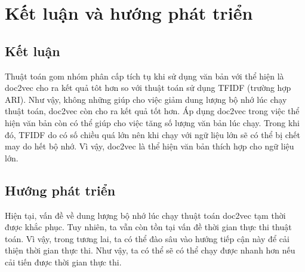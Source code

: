 \chapter{Kết luận và hướng phát triển}
\label{Chapter5}
\section{Kết luận}
Thuật toán gom nhóm phân cấp tích tụ khi sử dụng văn bản với thể hiện là doc2vec cho ra kết quả tôt hơn so với thuật toán sử dụng TFIDF (trường hợp ARI).
Như vậy, không những giúp cho việc giảm dung lượng bộ nhớ lúc chạy thuật toán, doc2vec còn cho ra kết quả tốt hơn.
Áp dụng doc2vec trong việc thể hiện văn bản còn có thể giúp cho việc tăng số lượng văn bản lúc chạy.
Trong khi đó, TFIDF do có số chiều quá lớn nên khi chạy với ngữ liệu lớn sẽ có thể bị chết may do hết bộ nhớ.
Vì vậy, doc2vec là thể hiện văn bản thích hợp cho ngữ liệu lớn.

\section{Hướng phát triển}
Hiện tại, vấn đề về dung lượng bộ nhớ lúc chạy thuật toán doc2vec tạm thời được khắc phục.
Tuy nhiên, ta vẫn còn tồn tại vấn đề thời gian thực thi thuật toán.
Vì vậy, trong tương lai, ta có thể đào sâu vào hướng tiếp cận này để cải thiện thời gian thực thi.
Như vậy, ta có thể sẽ có thể chạy được nhanh hơn nếu cải tiến được thời gian thực thi.




